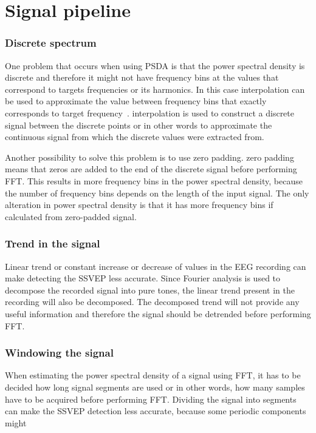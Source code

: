 \section{Signal pipeline}
\label{sec:signal_pipeline}

\subsubsection{Discrete spectrum}

One problem that occurs when using \gls{PSDA} is that the \gls{power spectral density} is discrete and therefore it might not have frequency bins at the values that correspond to \glspl{target} frequencies or its \glspl{harmonic}. In this case \gls{interpolation} can be used to approximate the value between frequency bins that exactly corresponds to \gls{target} frequency~\cite{cca_psda}. \Gls{interpolation} is used to construct a discrete signal between the discrete points or in other words to approximate the continuous signal from which the discrete values were extracted from.

Another possibility to solve this problem is to use \gls{zero padding}. \Gls{zero padding} means that zeros are added to the end of the discrete signal before performing \gls{FFT}. This results in more \glspl{frequency bin} in the \gls{power spectral density}, because the number of \glspl{frequency bin} depends on the length of the input signal. The only alteration in \gls{power spectral density} is that it has more \glspl{frequency bin} if calculated from zero-padded signal.

\subsubsection{Trend in the signal}

Linear trend or constant increase or decrease of values in the \gls{EEG} recording can make detecting the \gls{SSVEP} less accurate. Since Fourier analysis is used to decompose the recorded signal into \glspl{pure tone}, the linear trend present in the recording will also be decomposed. The decomposed trend will not provide any useful information and therefore the signal should be detrended before performing \gls{FFT}.

\subsubsection{Windowing the signal}

When estimating the \gls{power spectral density} of a signal using \gls{FFT}, it has to be decided how long signal segments are used or in other words, how many samples have to be acquired before performing \gls{FFT}. Dividing the signal into segments can make the \gls{SSVEP} detection less accurate, because some periodic components might

